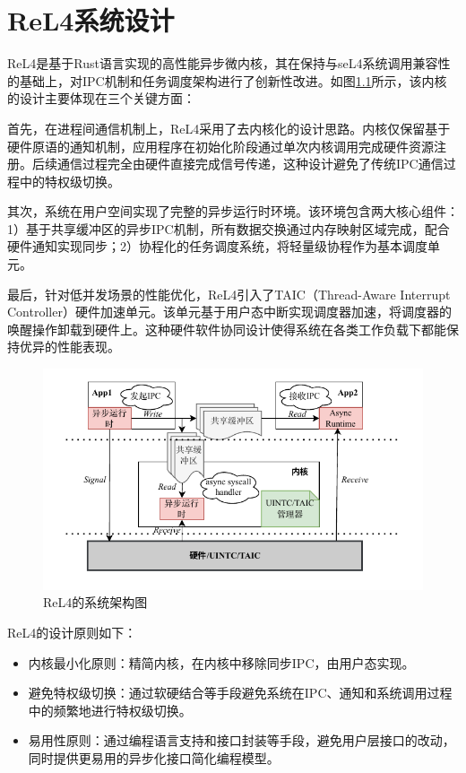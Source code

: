 \chapter{ReL4系统设计}
\label{chap:ReL4_intro}
ReL4是基于Rust语言实现的高性能异步微内核，其在保持与seL4系统调用兼容性的基础上，对IPC机制和任务调度架构进行了创新性改进。如图\ref{fig:ReL4_framework}所示，该内核的设计主要体现在三个关键方面：

首先，在进程间通信机制上，ReL4采用了去内核化的设计思路。内核仅保留基于硬件原语的通知机制，应用程序在初始化阶段通过单次内核调用完成硬件资源注册。后续通信过程完全由硬件直接完成信号传递，这种设计避免了传统IPC通信过程中的特权级切换。

其次，系统在用户空间实现了完整的异步运行时环境。该环境包含两大核心组件：1）基于共享缓冲区的异步IPC机制，所有数据交换通过内存映射区域完成，配合硬件通知实现同步；2）协程化的任务调度系统，将轻量级协程作为基本调度单元。

最后，针对低并发场景的性能优化，ReL4引入了TAIC（Thread-Aware Interrupt Controller）硬件加速单元。该单元基于用户态中断实现调度器加速，将调度器的唤醒操作卸载到硬件上。这种硬件软件协同设计使得系统在各类工作负载下都能保持优异的性能表现。
\begin{figure}[htbp]
  \centering
  \includegraphics{figures/ReL4_framework.pdf}
  \caption{ReL4的系统架构图}\label{fig:ReL4_framework}
\end{figure}

ReL4的设计原则如下：
\begin{itemize}
  \item 内核最小化原则：精简内核，在内核中移除同步IPC，由用户态实现。
  \item 避免特权级切换：通过软硬结合等手段避免系统在IPC、通知和系统调用过程中的频繁地进行特权级切换。
  \item 易用性原则：通过编程语言支持和接口封装等手段，避免用户层接口的改动，同时提供更易用的异步化接口简化编程模型。
\end{itemize}


